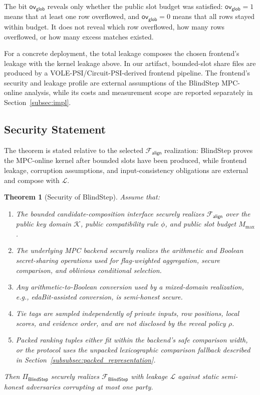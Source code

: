 \documentclass[conference,compsoc,letterpaper]{IEEEtran}
\newtheorem{theorem}{Theorem}[section]
\theoremstyle{definition}
\theoremstyle{remark}
\newcommand{\BlindStep}{BlindStep\xspace}
\newcommand{\FBlindStep}{\mathcal{F}_{\textsf{BlindStep}}}
\newcommand{\PiBlindStep}{\Pi_{\textsf{BlindStep}}}
\newcommand{\Leak}{\mathcal{L}}
\newcommand{\Falign}{\mathcal{F}_{\mathsf{align}}}
\newcommand{\Mmax}{M_{\max}}
\newcommand{\compat}{\phi}
\newcommand{\policy}{\rho}
\newcommand{\globaloverflow}{\mathsf{ov}_{\mathsf{glob}}}
\begin{document}
The bit $\globaloverflow$ reveals only whether the public slot budget was satisfied: $\globaloverflow=1$ means that at least one row overflowed, and $\globaloverflow=0$ means that all rows stayed within budget.
It does not reveal which row overflowed, how many rows overflowed, or how many excess matches existed.

For a concrete deployment, the total leakage composes the chosen frontend's leakage with the kernel leakage above.
In our artifact, bounded-slot share files are produced by a VOLE-PSI/Circuit-PSI-derived frontend pipeline.
The frontend's security and leakage profile are external assumptions of the \BlindStep{} MPC-online analysis, while its costs and measurement scope are reported separately in Section~\ref{subsec:impl}.
\subsection{Security Statement}
\label{subsec:theorem}

The theorem is stated relative to the selected $\Falign{}$ realization: \BlindStep{} proves the MPC-online kernel after bounded slots have been produced, while frontend leakage, corruption assumptions, and input-consistency obligations are external and compose with $\Leak$.

\begin{theorem}[Security of \BlindStep{}]
\label{thm:security}
Assume that:
\begin{enumerate}[label=(\arabic*), leftmargin=*, nosep]
    \item The bounded candidate-composition interface securely realizes $\Falign{}$ over the public key domain $\mathcal K$, public compatibility rule $\compat$, and public slot budget $\Mmax$.
    \item The underlying MPC backend securely realizes the arithmetic and Boolean secret-sharing operations used for flag-weighted aggregation, secure comparison, and oblivious conditional selection.
    \item Any arithmetic-to-Boolean conversion used by a mixed-domain realization, e.g., edaBit-assisted conversion, is semi-honest secure.
    \item Tie tags are sampled independently of private inputs, row positions, local scores, and evidence order, and are not disclosed by the reveal policy $\policy$.
    \item Packed ranking tuples either fit within the backend's safe comparison width, or the protocol uses the unpacked lexicographic comparison fallback described in    Section~\ref{subsubsec:packed_representation}.
\end{enumerate}
Then $\PiBlindStep{}$ securely realizes $\FBlindStep$ with leakage $\Leak$ against static semi-honest adversaries corrupting at most one party.
\end{theorem}
\end{document}
